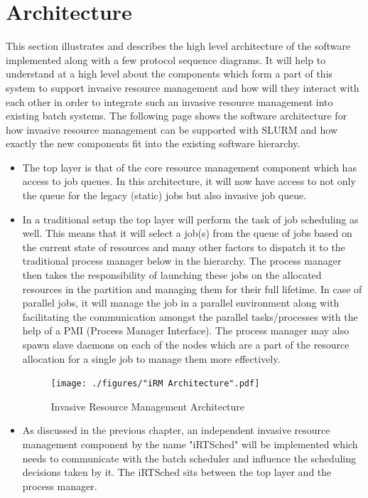 \chapter{Architecture}
\label{chapter:dynamic resource}
This section illustrates and describes the high level architecture of the software implemented along with a few protocol sequence diagrams. It will help to understand at a high level about the components which form a part of this system to support invasive resource management and how will they interact with each other in order to integrate such an invasive resource management into existing batch systems. The following page shows the software architecture for how invasive resource management can be supported with SLURM and how exactly the new components fit into the existing software hierarchy.
\begin{itemize}
\item The top layer is that of the core resource management component which has access to job queues. In this architecture, it will now have access to not only the queue for the legacy (static) jobs but also invasive job queue.
\item In a traditional setup the top layer will perform the task of job scheduling as well. This means that it will select a job(s) from the queue of jobs based on the current state of resources and many other factors to dispatch it to the traditional process manager below in the hierarchy. The process manager then takes the responsibility of launching these jobs on the allocated resources in the partition and managing them for their full lifetime. In case of parallel jobs, it will manage the job in a parallel environment along with facilitating the communication amongst the parallel tasks/processes with the help of a PMI (Process Manager Interface). The process manager may also spawn slave daemons on each of the nodes which are a part of the resource allocation for a single job to manage them more effectively.
\begin{figure}[!htbp]
\centering
\texttt{[image: ./figures/"iRM Architecture".pdf]}
\caption{Invasive Resource Management Architecture}
\label{fig:7}
\end{figure}
\item As discussed in the previous chapter, an independent invasive resource management component by the name "iRTSched" will be implemented which needs to communicate with the batch scheduler and influence the scheduling decisions taken by it. The iRTSched sits between the top layer and the process manager.

\end{itemize}
